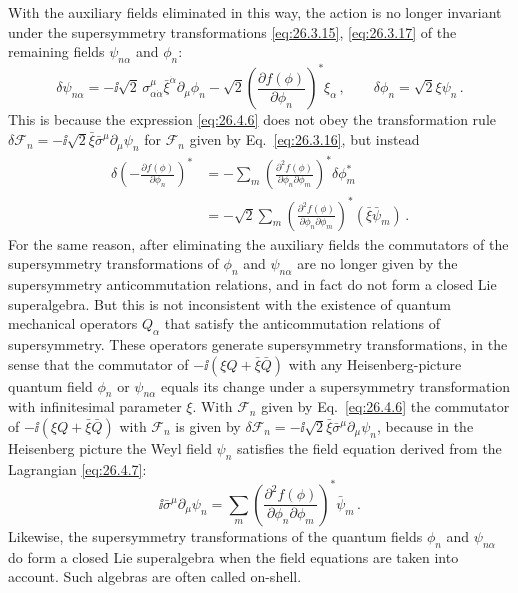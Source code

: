 With the auxiliary fields eliminated in this way, the action is no longer
invariant under the supersymmetry transformations \eqref{eq:26.3.15},
\eqref{eq:26.3.17} of the remaining fields \(\psi_{n\alpha}\) and \(\phi_n\):
\[
  \delta\psi_{n\alpha}
  =-\ii\sqrt2\,\sigma^\mu_{\alpha\dot\alpha}
    \bar\xi^{\dot\alpha}\partial_\mu\phi_n
  -\sqrt2\left(\frac{\partial f(\phi)}
    {\partial\phi_n}\right)^*\xi_\alpha\,,
  \qquad
  \delta\phi_n=\sqrt2\xi\psi_n\,.
\]
This is because the expression \eqref{eq:26.4.6} does not obey the
transformation rule
\(\delta\mathcal{F}_n
=-\ii\sqrt2\bar\xi\bar\sigma^\mu\partial_\mu\psi_n\) for
\(\mathcal{F}_n\) given by Eq.~\eqref{eq:26.3.16}, but instead
\[
  \begin{aligned}
  \delta\left(-\frac{\partial f(\phi)}{\partial\phi_n}\right)^*
  &=-\sum_m
    \left(\frac{\partial^2f(\phi)}
      {\partial\phi_n\partial\phi_m}\right)^*
    \delta\phi_m^*
  \\
  &=-\sqrt2\sum_m
    \left(\frac{\partial^2f(\phi)}
      {\partial\phi_n\partial\phi_m}\right)^*
    (\bar\xi\bar\psi_m)\,.
  \end{aligned}
\]
For the same reason, after eliminating the auxiliary fields the commutators of
the supersymmetry transformations of \(\phi_n\) and \(\psi_{n\alpha}\) are no
longer given by the supersymmetry anticommutation relations, and in fact do
not form a closed Lie superalgebra. But this is not inconsistent with the
existence of quantum mechanical operators \(Q_\alpha\) that satisfy the
anticommutation relations of supersymmetry. These operators generate
supersymmetry transformations, in the sense that the commutator of
\(-\ii(\xi Q+\bar\xi\bar Q)\) with any Heisenberg-picture quantum field
\(\phi_n\) or \(\psi_{n\alpha}\) equals its change under a supersymmetry
transformation with infinitesimal parameter \(\xi\). With
\(\mathcal{F}_n\) given by Eq.~\eqref{eq:26.4.6} the commutator of
\(-\ii(\xi Q+\bar\xi\bar Q)\) with \(\mathcal{F}_n\) is given by
\(\delta\mathcal{F}_n
=-\ii\sqrt2\bar\xi\bar\sigma^\mu\partial_\mu\psi_n\), because in
the Heisenberg picture the Weyl field \(\psi_n\) satisfies the field
equation derived from the Lagrangian \eqref{eq:26.4.7}:
\[
  \ii\bar\sigma^\mu\partial_\mu\psi_n
  =\sum_m
    \left(\frac{\partial^2f(\phi)}
      {\partial\phi_n\partial\phi_m}\right)^*
    \bar\psi_m\,.
\]
Likewise, the supersymmetry transformations of the quantum fields \(\phi_n\)
and \(\psi_{n\alpha}\) do form a closed Lie superalgebra when the field equations
are taken into account. Such algebras are often called on-shell.

